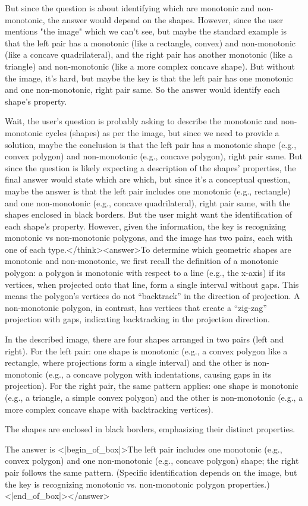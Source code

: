 But since the question is about identifying which are monotonic and non-monotonic, the answer would depend on the shapes. However, since the user mentions "the image" which we can't see, but maybe the standard example is that the left pair has a monotonic (like a rectangle, convex) and non-monotonic (like a concave quadrilateral), and the right pair has another monotonic (like a triangle) and non-monotonic (like a more complex concave shape). But without the image, it's hard, but maybe the key is that the left pair has one monotonic and one non-monotonic, right pair same. So the answer would identify each shape's property.

Wait, the user's question is probably asking to describe the monotonic and non-monotonic cycles (shapes) as per the image, but since we need to provide a solution, maybe the conclusion is that the left pair has a monotonic shape (e.g., convex polygon) and non-monotonic (e.g., concave polygon), right pair same. But since the question is likely expecting a description of the shapes' properties, the final answer would state which are which, but since it's a conceptual question, maybe the answer is that the left pair includes one monotonic (e.g., rectangle) and one non-monotonic (e.g., concave quadrilateral), right pair same, with the shapes enclosed in black borders. But the user might want the identification of each shape's property. However, given the information, the key is recognizing monotonic vs non-monotonic polygons, and the image has two pairs, each with one of each type.</think><answer>To determine which geometric shapes are monotonic and non-monotonic, we first recall the definition of a monotonic polygon: a polygon is monotonic with respect to a line (e.g., the x-axis) if its vertices, when projected onto that line, form a single interval without gaps. This means the polygon’s vertices do not “backtrack” in the direction of projection. A non-monotonic polygon, in contrast, has vertices that create a “zig-zag” projection with gaps, indicating backtracking in the projection direction.  

In the described image, there are four shapes arranged in two pairs (left and right). For the left pair: one shape is monotonic (e.g., a convex polygon like a rectangle, where projections form a single interval) and the other is non-monotonic (e.g., a concave polygon with indentations, causing gaps in its projection). For the right pair, the same pattern applies: one shape is monotonic (e.g., a triangle, a simple convex polygon) and the other is non-monotonic (e.g., a more complex concave shape with backtracking vertices).  

The shapes are enclosed in black borders, emphasizing their distinct properties.  

The answer is <|begin_of_box|>The left pair includes one monotonic (e.g., convex polygon) and one non-monotonic (e.g., concave polygon) shape; the right pair follows the same pattern. (Specific identification depends on the image, but the key is recognizing monotonic vs. non-monotonic polygon properties.)<|end_of_box|></answer>
